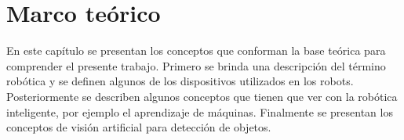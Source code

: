 \chapter{Marco teórico} \label{chap:marco_teorico}

\vspace{5 mm}

En este capítulo se presentan los conceptos que conforman la base teórica para comprender el presente trabajo. Primero se brinda una descripción del término robótica y se definen algunos de los dispositivos utilizados en los robots. Posteriormente se describen algunos conceptos que tienen que ver con la robótica inteligente, por ejemplo el aprendizaje de máquinas. Finalmente se presentan los conceptos de visión artificial para detección de objetos.
